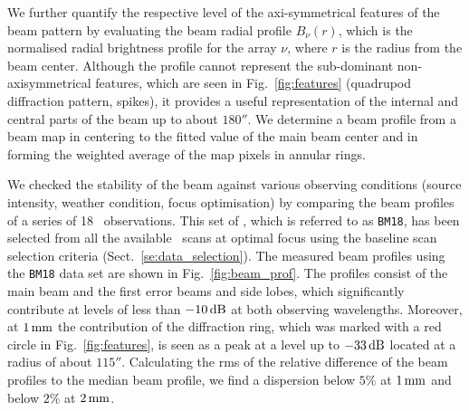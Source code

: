 We further quantify the respective level of the axi-symmetrical
features of the beam pattern by evaluating the beam radial profile
$B_\nu(r)$, which is the normalised radial brightness profile for the
array $\nu$, where $r$ is the radius from the beam center.
Although the profile cannot represent the sub-dominant non-axisymmetrical
features, which are seen in Fig.~\ref{fig:features} (quadrupod
diffraction pattern, spikes), it provides a useful
representation of the internal and central parts of the beam {\lp up to
 about $180''$.} We determine a beam profile from a beam map in centering to
the fitted value of the main beam center and in forming the
weighted average of the map pixels in annular rings.

We checked the stability of the beam against various
observing conditions (source intensity, weather condition, focus
optimisation) by comparing the beam profiles of a series of 18 \bm\
observations.
This set of \bms, which is referred to as {\tt BM18}, has been
selected from all the available \bm\ scans at optimal focus using the
baseline scan selection criteria (Sect.~\ref{se:data_selection}).
The measured beam profiles using the {\tt BM18} data set are shown in
Fig.~\ref{fig:beam_prof}. {\lp The profiles consist of the main beam and
the first error beams and side lobes, which significantly contribute
at levels of less than $-10\,\rm{dB}$ at both observing
wavelengths. Moreover, at $1\,\rm{mm}$ the contribution of the
diffraction ring, which was marked with a red circle in Fig.~\ref{fig:features},
is seen as a peak at a level up to $-33\,\rm{dB}$ located at a radius
of about $115''$.} Calculating the {\lp rms of the relative}
difference of the beam profiles to the median beam profile, we find a
dispersion below $5\%$ at $1\,\rm{mm}$ and below $2\%$ at
$2\,\rm{mm}$.

